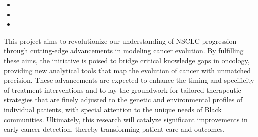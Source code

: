 \begin{itemize}[noitemsep]
    \item \SpecificAimThreeA
    \item \SpecificAimThreeB
    \item \SpecificAimThreeC
\end{itemize}

This project aims to revolutionize our understanding of NSCLC progression through cutting-edge advancements in modeling cancer evolution. 
By fulfilling these aims, the initiative is poised to bridge critical knowledge gaps in oncology, 
providing new analytical tools that map the evolution of cancer with unmatched precision. 
These advancements are expected to enhance the timing and specificity of treatment interventions 
and to lay the groundwork for tailored therapeutic strategies that are finely adjusted to the genetic and environmental profiles of individual patients, 
with special attention to the unique needs of Black communities. 
Ultimately, this research will catalyze significant improvements in early cancer detection, thereby transforming patient care and outcomes.

